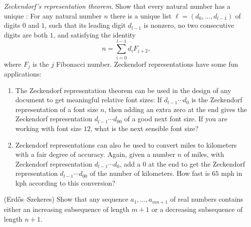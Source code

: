 \begin{challenge}
  \exercise \label{exercise:zeckendorf}\emph{Zeckendorf's representation theorem}. Show that every natural number has a unique : For any natural number $n$ there is a unique list $\ell=(d_0,\ldots,d_{l-1})$ of digits $0$ and $1$, such that its leading digit $d_{l-1}$ is nonzero, no two consecutive digits are both $1$, and satisfying the identity
  \begin{equation*}
    n=\sum_{i=0}^{l-1}d_iF_{i+2},
  \end{equation*}
  where $F_j$ is the $j$\supth{} Fibonacci number. Zeckendorf representations have some fun applications:
  \begin{enumerate}
  \item The Zeckendorf representation theorem can be used in the design of any document to get meaningful relative font sizes: If $d_{l-1}\cdots d_0$ is the Zeckendorf representation of a font size $n$, then adding an extra zero at the end gives the Zeckendorf representation $d_{l-1}\cdots d_00$ of a good next font size. If you are working with font size $12$, what is the next sensible font size?
  \item Zeckendorf representations can also be used to convert miles to kilometers with a fair degree of accuracy. Again, given a number $n$ of miles, with Zeckendorf representation $d_{l-1}\cdots d_0$, add a $0$ at the end to get the Zeckendorf representation $d_{l-1}\cdots d_00$ of the number of kilometers. How fast is $65$ mph in kph according to this conversion?
  \end{enumerate}
  \exercise (Erd\H{o}s--Szekeres) Show that any sequence $a_1,\ldots,a_{mn+1}$ of real numbers contains either an increasing subsequence of length $m+1$ or a decreasing subsequence of length $n+1$.
\end{challenge}

